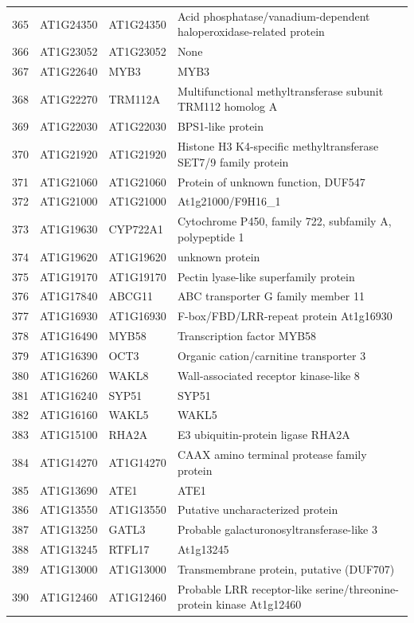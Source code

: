 \documentclass[11pt]{article}
\begin{document}
\begin{center}
\begin{tabular}{rlll}
365 & AT1G24350 & AT1G24350 & Acid phosphatase/vanadium-dependent haloperoxidase-related protein\\
366 & AT1G23052 & AT1G23052 & None\\
367 & AT1G22640 & MYB3 & MYB3\\
368 & AT1G22270 & TRM112A & Multifunctional methyltransferase subunit TRM112 homolog A\\
369 & AT1G22030 & AT1G22030 & BPS1-like protein\\
370 & AT1G21920 & AT1G21920 & Histone H3 K4-specific methyltransferase SET7/9 family protein\\
371 & AT1G21060 & AT1G21060 & Protein of unknown function, DUF547\\
372 & AT1G21000 & AT1G21000 & At1g21000/F9H16\_1\\
373 & AT1G19630 & CYP722A1 & Cytochrome P450, family 722, subfamily A, polypeptide 1\\
374 & AT1G19620 & AT1G19620 & unknown protein\\
375 & AT1G19170 & AT1G19170 & Pectin lyase-like superfamily protein\\
376 & AT1G17840 & ABCG11 & ABC transporter G family member 11\\
377 & AT1G16930 & AT1G16930 & F-box/FBD/LRR-repeat protein At1g16930\\
378 & AT1G16490 & MYB58 & Transcription factor MYB58\\
379 & AT1G16390 & OCT3 & Organic cation/carnitine transporter 3\\
380 & AT1G16260 & WAKL8 & Wall-associated receptor kinase-like 8\\
381 & AT1G16240 & SYP51 & SYP51\\
382 & AT1G16160 & WAKL5 & WAKL5\\
383 & AT1G15100 & RHA2A & E3 ubiquitin-protein ligase RHA2A\\
384 & AT1G14270 & AT1G14270 & CAAX amino terminal protease family protein\\
385 & AT1G13690 & ATE1 & ATE1\\
386 & AT1G13550 & AT1G13550 & Putative uncharacterized protein\\
387 & AT1G13250 & GATL3 & Probable galacturonosyltransferase-like 3\\
388 & AT1G13245 & RTFL17 & At1g13245\\
389 & AT1G13000 & AT1G13000 & Transmembrane protein, putative (DUF707)\\
390 & AT1G12460 & AT1G12460 & Probable LRR receptor-like serine/threonine-protein kinase At1g12460\\

\end{tabular}
\end{center}
\end{document}
